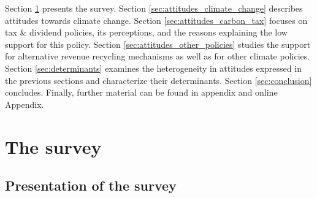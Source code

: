 \documentclass[english,5p,authoryear]{elsarticle}
\begin{document}
Section \ref{sec:survey} presents the survey. Section \ref{sec:attitudes_climate_change} describes attitudes towards climate change. Section \ref{sec:attitudes_carbon_tax} focuses on tax \& dividend policies, its perceptions, and the reasons explaining the low support for this policy. Section \ref{sec:attitudes_other_policies} studies the support for alternative revenue recycling mechanisms as well as for other climate policies. Section \ref{sec:determinants} examines the heterogeneity in attitudes expressed in the previous sections and characterize their determinants. Section \ref{sec:conclusion} concludes. Finally, further material can be found in appendix and online Appendix.






\section{The survey}\label{sec:survey}

    \subsection{Presentation of the survey}
\end{document}
